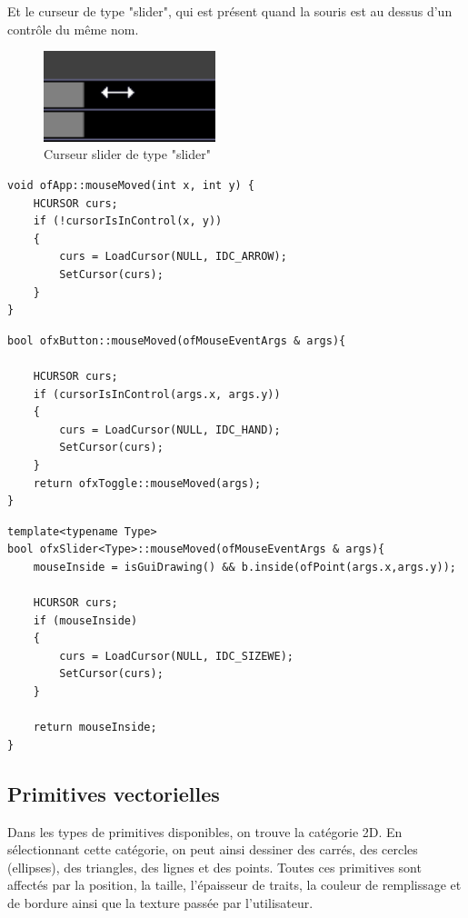 Et le curseur de type "slider", qui est présent quand la souris est au dessus d'un contrôle du même nom.

\begin{figure}[h]
	\centering
	\includegraphics[width=5cm]{fig/curseurSlider.png}
	\caption{Curseur slider de type "slider"}
	\label{fig:test}
\end{figure}

\begin{lstlisting}
void ofApp::mouseMoved(int x, int y) {
	HCURSOR curs;
	if (!cursorIsInControl(x, y))
	{
		curs = LoadCursor(NULL, IDC_ARROW);
		SetCursor(curs);
	}
}
\end{lstlisting}

\begin{lstlisting}
bool ofxButton::mouseMoved(ofMouseEventArgs & args){

	HCURSOR curs;
	if (cursorIsInControl(args.x, args.y))
	{
		curs = LoadCursor(NULL, IDC_HAND);
		SetCursor(curs);
	}
	return ofxToggle::mouseMoved(args);
}
\end{lstlisting}

\begin{lstlisting}
template<typename Type>
bool ofxSlider<Type>::mouseMoved(ofMouseEventArgs & args){
	mouseInside = isGuiDrawing() && b.inside(ofPoint(args.x,args.y));
	
	HCURSOR curs;
	if (mouseInside)
	{
		curs = LoadCursor(NULL, IDC_SIZEWE);
		SetCursor(curs);
	}
	
	return mouseInside;
}
\end{lstlisting}

\subsection{Primitives vectorielles}

Dans les types de primitives disponibles, on trouve la catégorie 2D. En sélectionnant cette catégorie, on peut ainsi dessiner des carrés, des cercles (ellipses), des triangles, des lignes et des points. Toutes ces primitives sont affectés par la position, la taille, l’épaisseur de traits, la couleur de remplissage et de bordure ainsi que la texture passée par l’utilisateur.\\

